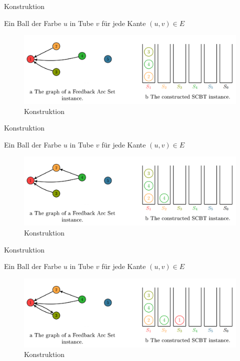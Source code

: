 \documentclass{beamer}
\begin{document}
\begin{frame}{Konstruktion}
\begin{pointlist}
\item Ein Ball der Farbe $u$ in Tube $v$ für jede Kante $(u,v)\in E$
\end{pointlist}
\begin{figure}[ht]
		\includegraphics[width=\textwidth]{construct07}
		\caption{Konstruktion}
    \end{figure}
\end{frame}

\begin{frame}{Konstruktion}
\begin{pointlist}
\item Ein Ball der Farbe $u$ in Tube $v$ für jede Kante $(u,v)\in E$
\end{pointlist}
\begin{figure}[ht]
		\includegraphics[width=\textwidth]{construct06}
		\caption{Konstruktion}
    \end{figure}
\end{frame}

\begin{frame}{Konstruktion}
\begin{pointlist}
\item Ein Ball der Farbe $u$ in Tube $v$ für jede Kante $(u,v)\in E$
\end{pointlist}
\begin{figure}[ht]
		\includegraphics[width=\textwidth]{construct05}
		\caption{Konstruktion}
    \end{figure}
\end{frame}
\end{document}
